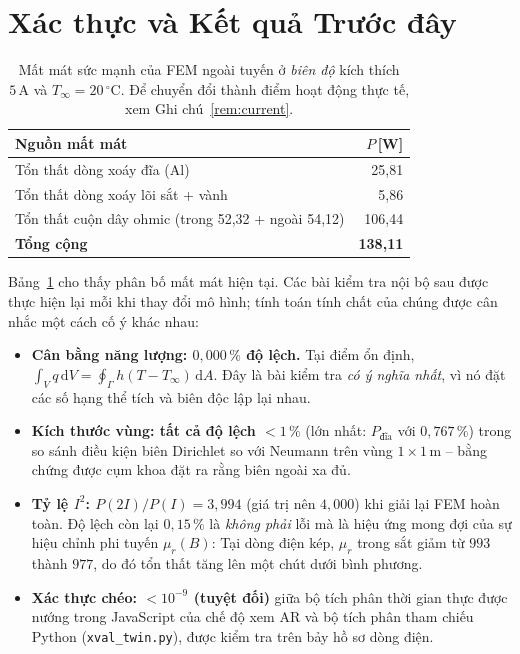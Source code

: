 \documentclass[a4paper, 10pt, conference]{ieeeconf}
\theoremstyle{remark}
\begin{document}
\section{Xác thực và Kết quả Trước đây}
\label{sec:validation}

\begin{table}[t]
\centering\small
\caption{Mất mát sức mạnh của FEM ngoài tuyến ở \emph{biên độ} kích thích $5\,\mathrm A$
và $T_\infty=20\,^\circ$C. Để chuyển đổi thành điểm hoạt động thực tế, xem Ghi chú~\ref{rem:current}.}
\label{tab:losses}
\begin{tabular}{@{}lr@{}}
\toprule
Nguồn mất mát & $P$\,[W] \\
\midrule
Tổn thất dòng xoáy đĩa (Al) & 25{,}81 \\
Tổn thất dòng xoáy lõi sắt + vành & 5{,}86 \\
Tổn thất cuộn dây ohmic (trong 52{,}32 + ngoài 54{,}12) & 106{,}44 \\
\midrule
\textbf{Tổng cộng} & \textbf{138{,}11} \\
\bottomrule
\end{tabular}
\end{table}

Bảng~\ref{tab:losses} cho thấy phân bố mất mát hiện tại. Các bài kiểm tra nội bộ
sau được thực hiện lại mỗi khi thay đổi mô hình; tính toán tính chất của chúng
được cân nhắc một cách cố ý khác nhau:

\begin{itemize}[nosep]
  \item \textbf{Cân bằng năng lượng: $0{,}000\,\%$ độ lệch.} Tại điểm ổn định,
        $\int_V q\,\mathrm dV = \oint_\Gamma h(T-T_\infty)\,\mathrm dA$. Đây là bài
        kiểm tra \emph{có ý nghĩa nhất}, vì nó đặt các số hạng thể tích và biên độc
        lập lại nhau.
  \item \textbf{Kích thước vùng: tất cả độ lệch $<1\,\%$} (lớn nhất:
        $P_{\mathrm{đĩa}}$ với $0{,}767\,\%$) trong so sánh điều kiện biên Dirichlet
        so với Neumann trên vùng $1\times1\,\mathrm m$ -- bằng chứng được cụm khoa
        đặt ra rằng biên ngoài xa đủ.
  \item \textbf{Tỷ lệ $I^2$: $P(2I)/P(I) = 3{,}994$} (giá trị nên $4{,}000$) khi
        giải lại FEM hoàn toàn. Độ lệch còn lại $0{,}15\,\%$ là \emph{không phải}
        lỗi mà là hiệu ứng mong đợi của sự hiệu chỉnh phi tuyến $\mu_r(B)$: Tại
        dòng điện kép, $\mu_r$ trong sắt giảm từ $993$ thành $977$, do đó tổn thất
        tăng lên một chút dưới bình phương.
  \item \textbf{Xác thực chéo: $<10^{-9}$ (tuyệt đối)} giữa bộ tích phân thời gian
        thực được nướng trong JavaScript của chế độ xem AR và bộ tích phân tham chiếu
        Python (\texttt{xval\_twin.py}), được kiểm tra trên bảy hồ sơ dòng điện.
\end{itemize}
\end{document}
